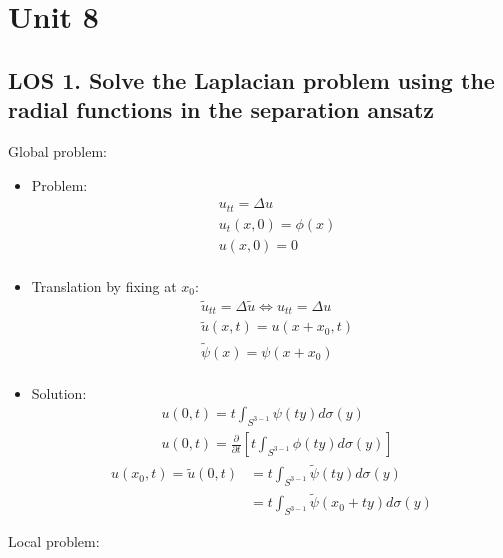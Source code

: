 \documentclass[12pt, a4paper]{article}
\begin{document}
\section*{Unit 8}
\vspace{1em}

\subsection*{LOS 1. Solve the Laplacian problem using the radial functions in the separation ansatz}
Global problem:
\begin{itemize}
    \item Problem:
    \begin{align*}
        &u_{tt} = \Delta u\\
        &u_t(x,0) = \phi(x)\\
        &u(x, 0)=0\\
    \end{align*}
    \item Translation by fixing at $x_0$:
    \begin{align*}
        &\tilde{u}_{tt} = \Delta \tilde{u} \Leftrightarrow u_{tt} = \Delta u\\
        &\tilde{u}(x, t) = u(x+x_0, t)\\
        &\tilde{\psi}(x) = \psi(x+x_0)\\
    \end{align*}
    \item Solution:
    \begin{align*}
        &u(0, t) = t\int_{S^{3-1}}\psi(ty)d\sigma(y)\\
        &u(0, t) = \frac{\partial}{\partial  t}\left[t\int_{S^{3-1}}\phi(ty)d\sigma(y)\right]
    \end{align*}
    \begin{align*}
        u(x_0, t) = \tilde{u}(0, t) &= t\int_{S^{3-1}}\tilde{\psi}(ty)d\sigma(y)\\
        &=t\int_{S^{3-1}}\tilde{\psi}(x_0+ty)d\sigma(y)
    \end{align*}
\end{itemize}
Local problem:
\end{document}
